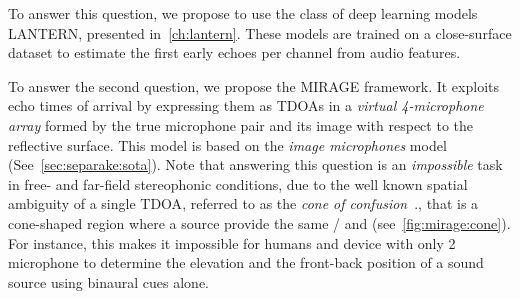 To answer this question, we propose to use the class of deep learning models \acs{LANTERN}, presented in~\cref{ch:lantern}.
These models are trained on a close-surface dataset to estimate the first early echoes per channel from audio features.

To answer the second question, we propose the \acf{MIRAGE} framework.
It exploits echo times of arrival by expressing them as \acp{TDOA} in a \textit{virtual 4-microphone array} formed by the true microphone pair and its image with respect to the reflective surface.
This model is based on the \textit{image microphones} model (See~\cref{sec:separake:sota}).
Note that answering this question is an \textit{impossible} task in free- and far-field stereophonic conditions, due to the well known spatial ambiguity of a single \ac{TDOA}, referred to as the \textit{cone of confusion}~., that is a cone-shaped region where a source provide the same \TDOA/ and (see~\cref{fig:mirage:cone}).
For instance, this makes it impossible for humans and device with only 2 microphone to determine the elevation and the front-back position of a sound source using binaural cues alone.

